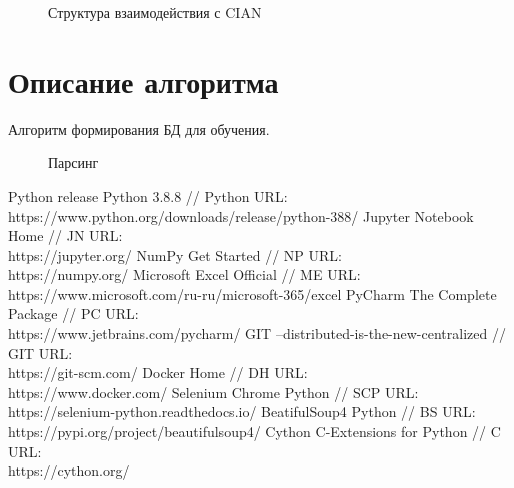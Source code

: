 \documentclass{article}
\begin{document}
			\begin{figure}[H]
				\centering
				\caption{Структура взаимодействия с CIAN}
				\label{fig:cian}
			\end{figure}
	
	\newpage
	\section{Описание алгоритма}	
		
		Алгоритм формирования БД для обучения.
		
		\begin{figure}[H]
			\centering
			\caption{Парсинг}
			\label{fig:algorithm_parsing}
		\end{figure}
		
	\newpage
	\begin{thebibliography}{}
		  Python release Python 3.8.8 // Python URL: \\ https://www.python.org/downloads/release/python-388/ 
		  Jupyter Notebook Home // JN URL: \\ https://jupyter.org/
		  NumPy Get Started // NP URL: \\ https://numpy.org/
		  Microsoft Excel Official // ME URL: \\ https://www.microsoft.com/ru-ru/microsoft-365/excel
		  PyCharm The Complete Package // PC URL: \\ https://www.jetbrains.com/pycharm/
			GIT --distributed-is-the-new-centralized // GIT URL: \\
		https://git-scm.com/
		  Docker Home // DH URL: \\
		https://www.docker.com/
		  Selenium Chrome Python // SCP URL: \\
		https://selenium-python.readthedocs.io/
		  BeatifulSoup4 Python // BS URL: \\
		https://pypi.org/project/beautifulsoup4/
		 Cython C-Extensions for Python // C URL: \\
		https://cython.org/
	\end{thebibliography}
\end{document}
